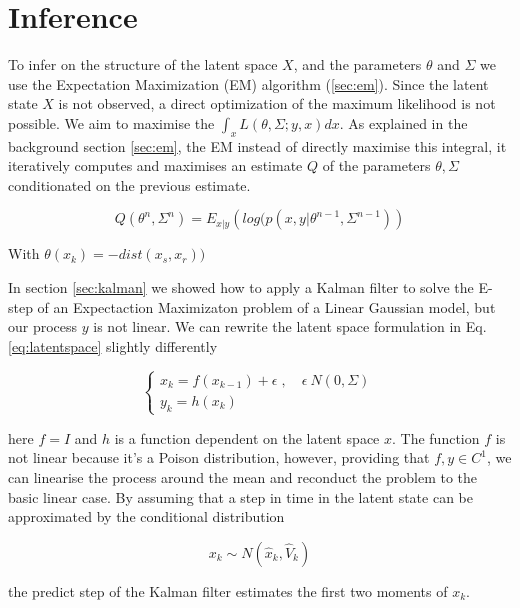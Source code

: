 \documentclass[mscthesis]{usiinfthesis}
\begin{document}
\section{Inference}
To infer on the structure of the latent space $X$, and the parameters $\theta$  and $\Sigma$ we use the Expectation Maximization (EM) algorithm (\ref{sec:em}). Since the latent state $X$ is not observed, a direct optimization of the maximum likelihood is not possible. We aim to maximise the $\int_x L(\theta, \Sigma ; y, x) dx$. As explained in the background section \ref{sec:em}, the EM instead of directly maximise this integral, it iteratively computes and maximises an estimate $Q$ of the parameters $\theta, \Sigma$ conditionated on the previous estimate. 

\[
Q(\theta^{n}, \Sigma^{n}) = E_{x|y} \left( log(p(x, y | \theta^{n-1}, \Sigma^{n-1}) \right)
\]

With $\theta(x_k) = -dist(x_s, x_r))$


In section \ref{sec:kalman} we showed how to apply a Kalman filter to solve the E-step of an Expectaction Maximizaton problem of a Linear Gaussian model, but our process $y$ is not linear. We can rewrite the latent space formulation in Eq. \ref{eq:latentspace} slightly differently

\begin{eqfloat}
\begin{equation}
    \begin{cases}
      x_k = f(x_{k-1}) + \epsilon \; , \quad \epsilon ~ N(0, \Sigma) \\
      y_k = h(x_k) 
    \end{cases}\,
\label{eq:latentspace2}
\end{equation}
\end{eqfloat}

here $f = I$ and $h$ is a function dependent on the latent space $x$. The function $f$ is not linear because it's a Poison distribution, however, providing that $f, y \in C^1$, we can linearise the process around the mean and reconduct the problem to the basic linear case. By assuming that a step in time in the latent state can be approximated by the conditional distribution 

\[
x_{k} \sim N( \hat{x}_k, \hat{V}_k)
\]

the predict step of the Kalman filter estimates the first two moments of $x_k$. 
\end{document}
